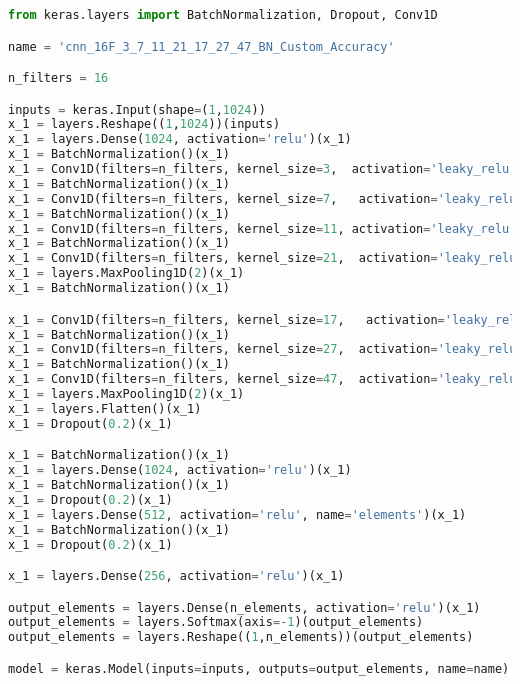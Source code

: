 \begin{lstlisting}[language=Python]
from keras.layers import BatchNormalization, Dropout, Conv1D

name = 'cnn_16F_3_7_11_21_17_27_47_BN_Custom_Accuracy'

n_filters = 16

inputs = keras.Input(shape=(1,1024))
x_1 = layers.Reshape((1,1024))(inputs)
x_1 = layers.Dense(1024, activation='relu')(x_1)
x_1 = BatchNormalization()(x_1)
x_1 = Conv1D(filters=n_filters, kernel_size=3,  activation='leaky_relu', data_format='channels_first')(x_1)
x_1 = BatchNormalization()(x_1)
x_1 = Conv1D(filters=n_filters, kernel_size=7,   activation='leaky_relu', data_format='channels_first')(x_1)
x_1 = BatchNormalization()(x_1)
x_1 = Conv1D(filters=n_filters, kernel_size=11, activation='leaky_relu', data_format='channels_first')(x_1)
x_1 = BatchNormalization()(x_1)
x_1 = Conv1D(filters=n_filters, kernel_size=21,  activation='leaky_relu', data_format='channels_first')(x_1)
x_1 = layers.MaxPooling1D(2)(x_1)
x_1 = BatchNormalization()(x_1)

x_1 = Conv1D(filters=n_filters, kernel_size=17,   activation='leaky_relu', data_format='channels_first')(x_1)
x_1 = BatchNormalization()(x_1)
x_1 = Conv1D(filters=n_filters, kernel_size=27,  activation='leaky_relu', data_format='channels_first')(x_1)
x_1 = BatchNormalization()(x_1)
x_1 = Conv1D(filters=n_filters, kernel_size=47,  activation='leaky_relu', data_format='channels_first')(x_1)
x_1 = layers.MaxPooling1D(2)(x_1)
x_1 = layers.Flatten()(x_1)
x_1 = Dropout(0.2)(x_1)

x_1 = BatchNormalization()(x_1)
x_1 = layers.Dense(1024, activation='relu')(x_1)
x_1 = BatchNormalization()(x_1)
x_1 = Dropout(0.2)(x_1)
x_1 = layers.Dense(512, activation='relu', name='elements')(x_1)
x_1 = BatchNormalization()(x_1)
x_1 = Dropout(0.2)(x_1)

x_1 = layers.Dense(256, activation='relu')(x_1)

output_elements = layers.Dense(n_elements, activation='relu')(x_1)
output_elements = layers.Softmax(axis=-1)(output_elements)
output_elements = layers.Reshape((1,n_elements))(output_elements)

model = keras.Model(inputs=inputs, outputs=output_elements, name=name)
\end{lstlisting}

